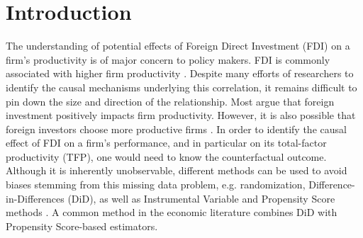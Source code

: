 \documentclass[a4paper,11pt]{scrartcl}
\begin{document}
\section{Introduction}

The understanding of potential effects of Foreign Direct Investment (FDI) on a firm's productivity is of major concern to policy makers. FDI is commonly associated with higher firm productivity \citep{girma2007}. Despite many efforts of researchers to identify the causal mechanisms underlying this correlation, it remains difficult to pin down the size and direction of the relationship. Most argue that foreign investment positively impacts firm productivity. However, it is also possible that foreign investors choose more productive firms \citep{arnold2009}. %
In order to identify the causal effect of FDI on a firm’s performance, and in particular on its total-factor productivity (TFP), one would need to know the counterfactual outcome. Although it is inherently unobservable, different methods can be used to avoid %
biases stemming from this missing data problem, e.g. randomization,  Difference-in-Differences (DiD), as well as Instrumental Variable and Propensity Score methods \citep{karpaty2007}. A common method in the economic literature combines DiD with Propensity Score-based estimators. 


\end{document}
